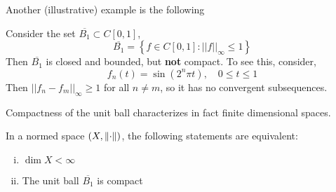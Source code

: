 \documentclass{article}
\begin{document}
Another (illustrative) example is the following  

\begin{example}
    Consider the set $\overline{B_1} \subset C[0,1]$,  
    \begin{equation*}
        \overline{B_1} = \left\{ f \in C[0,1] : ||f||_{\infty} \leq 1 \right\}
    \end{equation*}  
    Then $\overline{B_1}$ is closed and bounded, but \textbf{not} compact. To see this,
    consider,  
    \begin{equation*}
        f_n(t) = \sin(2^n \pi t), \quad 0 \leq t \leq 1
    \end{equation*}  
    Then $||f_n-f_m||_{\infty}\geq 1$ for all $n \neq m$, so it has no convergent subsequences. 
\end{example}

Compactness of the unit ball characterizes in fact finite dimensional spaces.  

\begin{theorem}\nextline
    In a normed space $(X, \left\|{\cdot}\right\|)$, the following statements are equivalent:  
    \begin{enumerate}[i)]
        \item $\dim X < \infty$
        \item The unit ball $\overline{B_1}$ is compact 
    \end{enumerate}
\end{theorem}  
\end{document}
